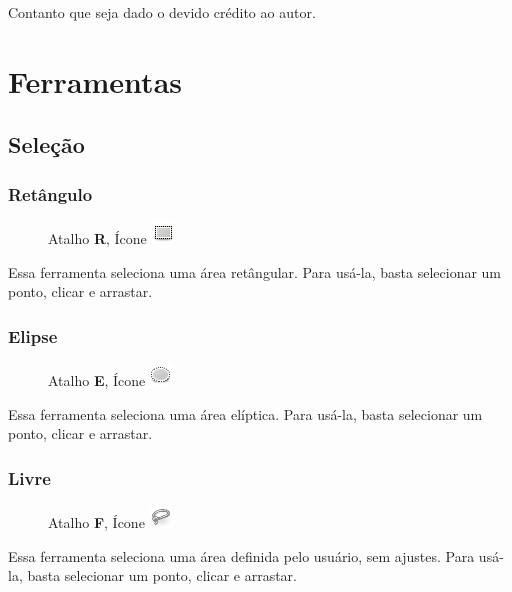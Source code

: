 \documentclass[12pt,onecolumn]{article}
\begin{document}
    Contanto que seja dado o devido crédito ao autor.
    
\clearpage
\section{Ferramentas}

  \subsection{Seleção}
    \subsubsection{Retângulo}
      \begin{figure}[H]
        Atalho {\bf R}, Ícone 
        \includegraphics{gimp-icons/stock-tool-rect-select-22.png}
        \label{fig:rectselect}
      \end{figure}
      Essa ferramenta seleciona uma área retângular. Para usá-la, basta selecionar um ponto,
      clicar e arrastar.

      \subsubsection{Elipse}
      \begin{figure}[H]
        Atalho {\bf E}, Ícone 
        \includegraphics{gimp-icons/stock-tool-ellipse-select-22.png}
        \label{fig:ellipseselect}
      \end{figure}
      Essa ferramenta seleciona uma área elíptica. Para usá-la, basta selecionar um ponto,
      clicar e arrastar.

      \subsubsection{Livre}
      \begin{figure}[H]
        Atalho {\bf F}, Ícone
        \includegraphics{gimp-icons/stock-tool-free-select-22.png}
        \label{fig:freeselect}
      \end{figure}
      Essa ferramenta seleciona uma área definida pelo usuário, sem ajustes. Para usá-la, basta
      selecionar um ponto, clicar e arrastar.
      
\end{document}
